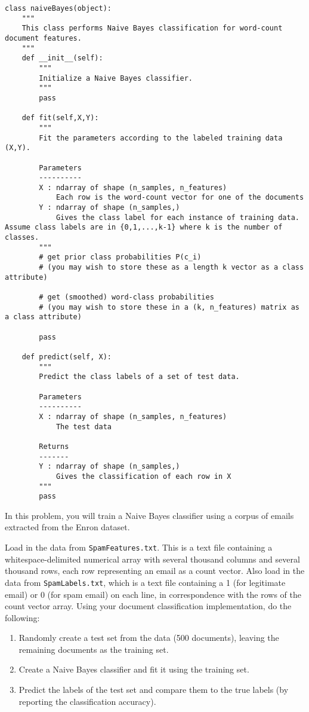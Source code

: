 \begin{lstlisting}
class naiveBayes(object):
    """
    This class performs Naive Bayes classification for word-count document features.
    """
    def __init__(self):
        """
        Initialize a Naive Bayes classifier.
        """
        pass

    def fit(self,X,Y):
        """
        Fit the parameters according to the labeled training data (X,Y).

        Parameters
        ----------
        X : ndarray of shape (n_samples, n_features)
            Each row is the word-count vector for one of the documents
        Y : ndarray of shape (n_samples,)
            Gives the class label for each instance of training data. Assume class labels are in {0,1,...,k-1} where k is the number of classes.
        """
        # get prior class probabilities P(c_i)
        # (you may wish to store these as a length k vector as a class attribute)

        # get (smoothed) word-class probabilities
        # (you may wish to store these in a (k, n_features) matrix as a class attribute)

        pass

    def predict(self, X):
        """
        Predict the class labels of a set of test data.

        Parameters
        ----------
        X : ndarray of shape (n_samples, n_features)
            The test data

        Returns
        -------
        Y : ndarray of shape (n_samples,)
            Gives the classification of each row in X
        """
        pass
\end{lstlisting}

In this problem, you will train a Naive Bayes classifier using a corpus of emails extracted from the Enron dataset.

Load in the data from {\tt SpamFeatures.txt}. This is a text file containing a whitespace-delimited
numerical array with several thousand columns and several thousand rows, each row representing an email
as a count vector.
Also load in the data from {\tt SpamLabels.txt}, which is a text file containing a 1 (for legitimate email) or 0
(for spam email) on each line, in correspondence with the rows of the count vector array.
Using your document classification implementation, do the following:
\begin{enumerate}
\item Randomly create a test set from the data (500 documents), leaving the remaining documents as the training set.
\item Create a Naive Bayes classifier and fit it using the training set.
\item Predict the labels of the test set and compare them to the true labels (by reporting the classification accuracy).
\end{enumerate}

